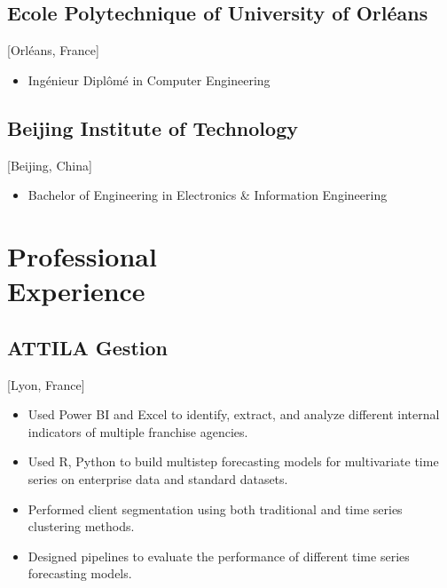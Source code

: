 \documentclass{mycv}
\begin{document}
\subsection{Ecole Polytechnique of University of Orl\'eans}[Orl\'eans, France]
\begin{itemize}[label={}]
  \item Ing\'enieur Dipl\^om\'e in Computer Engineering 
\end{itemize}

\subsection{Beijing Institute of Technology}[Beijing, China]
\begin{itemize}[label={}]
  \item Bachelor of Engineering in Electronics \& Information Engineering 
\end{itemize}

\section{Professional \\ Experience}

\subsection{ATTILA Gestion}[Lyon, France]

\begin{positions}
\end{positions}

\begin{itemize}
  \item Used Power BI and Excel to identify, extract, and analyze different internal indicators of multiple franchise agencies.
  \item Used R, Python to build multistep forecasting models for multivariate time series on enterprise data and standard datasets.
  \item Performed client segmentation using both traditional and time series clustering methods.
  \item Designed pipelines to evaluate the performance of different time series forecasting models.
\end{itemize}
\end{document}
